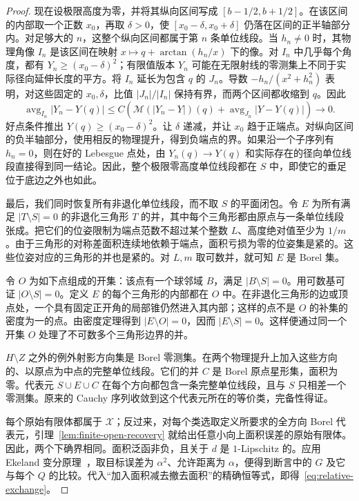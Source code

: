 \begin{proof}
现在设极限高度为零，并将其纵向区间写成 $[b-1/2,b+1/2]$。在该区间的内部取一个正数 $x_0$，再取 $\delta>0$，使 $[x_0-\delta,x_0+\delta]$ 仍落在区间的正半轴部分内。对足够大的 $n$，这整个纵向区间都属于第 $n$ 条单位线段。当 $h_n\ne0$ 时，其物理角像 $I_n$ 是该区间在映射 $x\mapsto q+\arctan(h_n/x)$ 下的像。对 $I_n$ 中几乎每个角度，都有 $Y_n\ge(x_0-\delta)^2$；有限值版本 $Y_n$ 可能在无限射线的零测集上不同于实际径向延伸长度的平方。将 $I_n$ 延长为包含 $q$ 的 $J_n$。导数 $-h_n/(x^2+h_n^2)$ 表明，对这些固定的 $x_0,\delta$，比值 $|J_n|/|I_n|$ 保持有界，而两个区间都收缩到 $q$。因此
\[
 \operatorname{avg}_{I_n}|Y_n-Y(q)|
 \le C\left(\mathcal M(|Y_n-Y|)(q)
                 +\operatorname{avg}_{J_n}|Y-Y(q)|\right)\longrightarrow0.
\]
好点条件推出 $Y(q)\ge(x_0-\delta)^2$。让 $\delta$ 递减，并让 $x_0$ 趋于正端点。对纵向区间的负半轴部分，使用相反的物理提升，得到负端点的界。如果沿一个子序列有 $h_n=0$，则在好的 Lebesgue 点处，由 $Y_n(q)\to Y(q)$ 和实际存在的径向单位线段直接得到同一结论。因此，整个极限零高度单位线段都在 $S$ 中，即使它的垂足位于底边之外也如此。

最后，我们同时恢复所有非退化单位线段，而不取 $S$ 的平面闭包。令 $E$ 为所有满足 $|T\setminus S|=0$ 的非退化三角形 $T$ 的并，其中每个三角形都由原点与一条单位线段张成。把它们的位姿限制为端点范数不超过某个整数 $L$、高度绝对值至少为 $1/m$。由于三角形的对称差面积连续地依赖于端点，面积亏损为零的位姿集是紧的。这些位姿对应的三角形的并也是紧的。对 $L,m$ 取可数并，就可知 $E$ 是 Borel 集。

令 $O$ 为如下点组成的开集：该点有一个球邻域 $B$，满足 $|B\setminus S|=0$。用可数基可证 $|O\setminus S|=0$。定义 $E$ 的每个三角形的内部都在 $O$ 中。在非退化三角形的边或顶点处，一个具有固定正开角的局部锥仍然进入其内部；这样的点不是 $O$ 的补集的密度为一的点。由密度定理得到 $|E\setminus O|=0$，因而 $|E\setminus S|=0$。这样便通过同一个开集 $O$ 处理了不可数多个三角形边界的并。

$H\setminus Z$ 之外的例外射影方向集是 Borel 零测集。在两个物理提升上加入这些方向的、以原点为中点的完整单位线段。它们的并 $C$ 是 Borel 原点星形集，面积为零。代表元 $S\cup E\cup C$ 在每个方向都包含一条完整单位线段，且与 $S$ 只相差一个零测集。原来的 Cauchy 序列收敛到这个代表元所在的等价类，完备性得证。

每个原始有限体都属于 $\mathcal X$；反过来，对每个类选取定义所要求的全方向 Borel 代表元，引理~\ref{lem:finite-open-recovery} 就给出任意小向上面积误差的原始有限体。因此，两个下确界相同。面积泛函非负，且关于 $d$ 是 $1$-Lipschitz 的。应用 Ekeland 变分原理~\cite{Ekeland1974}，取目标误差为 $\alpha^2$、允许距离为 $\alpha$，便得到断言中的 $G$ 及它与每个 $Q$ 的比较。代入“加入面积减去撤去面积”的精确恒等式，即得~\eqref{eq:relative-exchange}。
\end{proof}

